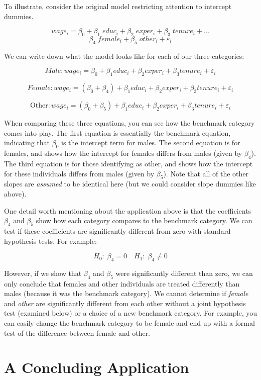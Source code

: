 \documentclass[
]{book}
\begin{document}
To illustrate, consider the original model restricting attention to intercept dummies.

\[wage_i=\beta_0+\beta_1\;educ_i+\beta_2\;exper_i+\beta_3\;tenure_i+...\]
\[\beta_4\;female_i +\beta_5\;other_i +\varepsilon_i\]

We can write down what the model looks like for each of our three categories:

\[Male: wage_i=\beta_0+\beta_1educ_i+\beta_2exper_i+\beta_3tenure_i+\varepsilon_i\]

\[Female: wage_i=(\beta_0+\beta_4)+\beta_1educ_i+\beta_2exper_i+\beta_3tenure_i+\varepsilon_i\]

\[\mbox{Other}: wage_i=(\beta_0+\beta_5)+\beta_1educ_i+\beta_2exper_i+\beta_3tenure_i+\varepsilon_i\]

When comparing these three equations, you can see how the benchmark category comes into play. The first equation is essentially the benchmark equation, indicating that \(\beta_0\) is the intercept term for males. The second equation is for females, and shows how the intercept for females differs from males (given by \(\beta_4\)). The third equation is for those identifying as other, and shows how the intercept for these individuals differs from males (given by \(\beta_5\)). Note that all of the other slopes are \emph{assumed} to be identical here (but we could consider slope dummies like above).

One detail worth mentioning about the application above is that the coefficients \(\beta_4\) and \(\beta_5\) show how each category compares to the benchmark category. We can test if these coefficients are significantly different from zero with standard hypothesis tests. For example:

\[H_0: \; \beta_4 = 0 \quad H_1: \; \beta_4 \neq 0\]

However, if we show that \(\beta_4\) and \(\beta_5\) were significantly different than zero, we can only conclude that females and other individuals are treated differently than males (because it was the benchmark category). We cannot determine if \emph{female} and \emph{other} are significantly different from each other without a joint hypothesis test (examined below) or a choice of a new benchmark category. For example, you can easily change the benchmark category to be female and end up with a formal test of the difference between female and other.

\section{A Concluding Application}\label{a-concluding-application-3}
\end{document}
